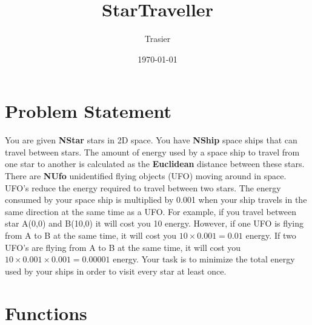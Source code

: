 \documentclass[hyperref,UTF8]{ctexart}
\theoremstyle{definition}
\theoremstyle{remark}
\numberwithin{equation}{subsection}
\newcommand{\Emph}{\textbf}
\begin{document}
\title{\Huge StarTraveller}
\vspace{2cm}
\author{\Large Trasier}
\date{\today}
\maketitle

\section{Problem Statement}
\label{sec:problem_statement}
	
	You are given \Emph{NStar} stars in 2D space.
	You have \Emph{NShip} space ships that can travel between stars.
	The amount of energy used by a space ship to travel from one star to another is calculated as the
	\Emph{Euclidean} distance between these stars.
	There are \Emph{NUfo} unidentified flying objects (UFO) moving around in space.
	UFO's reduce the energy required to travel between two stars.
	The energy consumed by your space ship is multiplied by 0.001 when your ship travels in the same direction at the same time as a UFO.
	For example, if you travel between star A(0,0) and B(10,0) it will cost you 10 energy.
	However, if one UFO is flying from A to B at the same time, it will cost you $10 \times 0.001=0.01$ energy.
	If two UFO's are flying from A to B at the same time, it will cost you $10 \times 0.001 \times 0.001=0.00001$ energy.
	Your task is to minimize the total energy used by your ships in order to visit every star at least once.

\section{Functions}
	
\end{document}
